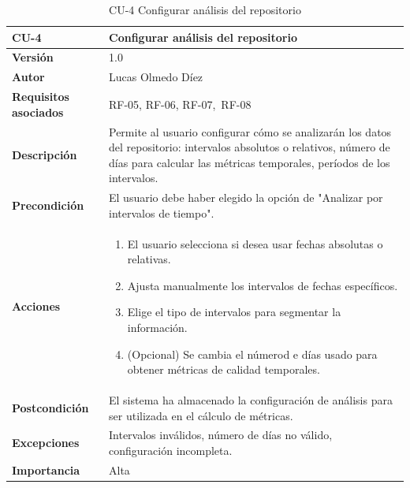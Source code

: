 \clearpage
\begin{table}[p]
    \centering
    \begin{tabularx}{\linewidth}{ p{} p{} }
        \toprule
        \textbf{CU-4} & Configurar análisis del repositorio \\
        \midrule
        \textbf{Versión} & 1.0 \\
        \textbf{Autor} & Lucas Olmedo Díez \\
        \textbf{Requisitos asociados} & RF-05, RF-06, RF-07,\ RF-08 \\
        \textbf{Descripción} & Permite al usuario configurar cómo se analizarán los datos del repositorio: intervalos absolutos o relativos, número de días para calcular las métricas temporales, períodos de los intervalos. \\
        \textbf{Precondición} & El usuario debe haber elegido la opción de "Analizar por intervalos de tiempo". \\
        \textbf{Acciones} &
        \begin{enumerate}
            \def\labelenumi{\arabic{enumi}.}
            \tightlist
            \item El usuario selecciona si desea usar fechas absolutas o relativas.
            \item Ajusta manualmente los intervalos de fechas específicos.
            \item Elige el tipo de intervalos para segmentar la información.
            \item (Opcional) Se cambia el númerod e días usado para obtener métricas de calidad temporales.
        \end{enumerate}\\
        \textbf{Postcondición} & El sistema ha almacenado la configuración de análisis para ser utilizada en el cálculo de métricas. \\
        \textbf{Excepciones} & Intervalos inválidos, número de días no válido, configuración incompleta. \\
        \textbf{Importancia} & Alta \\
        \bottomrule
    \end{tabularx}
    \caption{CU-4 Configurar análisis del repositorio}
\end{table}

